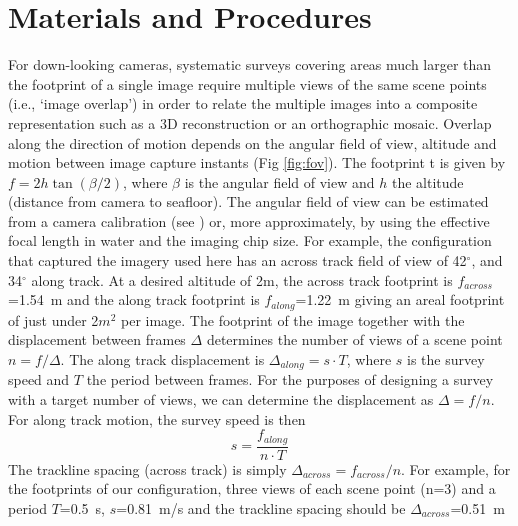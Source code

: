 \section{Materials and Procedures}
\label{sec:MandP}


For down-looking cameras, systematic surveys covering areas much larger than the footprint of a single image require multiple views of the same scene points (i.e., `image overlap') in order to relate the multiple images into a composite representation such as a 3D reconstruction or an orthographic mosaic. Overlap along the direction of motion depends on the angular field of view, altitude and motion between image capture instants (Fig \ref{fig:fov}). The footprint t is given by $f = 2 h \tan(\beta/2)$, where $\beta$ is the angular field of view and $h$ the altitude (distance from camera to seafloor). The angular field of view can be estimated from a camera calibration (see \cite{}) or, more approximately, by using the effective focal length in water and the imaging chip size. For example, the configuration that captured the imagery used here has an across track field of view of 42$^\circ$, and 34$^\circ$ along track. At a desired altitude of 2m, the across track footprint is $f_{across}$=1.54~m and the along track footprint is $f_{along}$=1.22~m giving an areal footprint of just under 2$m^2$ per image. 
The footprint of the image together with the displacement between frames $\Delta$ determines the number of views of a scene point $n = f /\Delta$. The along track displacement is $\Delta_{along} = s \cdot T$, where $s$ is the survey speed and $T$ the period between frames. 
For the purposes of designing a survey with a target number of views, we can determine the displacement as $\Delta = f/n$. For along track motion, the survey speed is then
\begin{equation}
s = \frac{f_{along}}{n \cdot T}
\end{equation}
The trackline spacing (across track) is simply $\Delta_{across} = f_{across}/n$.
For example, for the footprints of our configuration, three views of each scene point (n=3) and a period $T$=0.5~s, $s$=0.81~m/s and the trackline spacing should be $\Delta_{across}$=0.51~m

